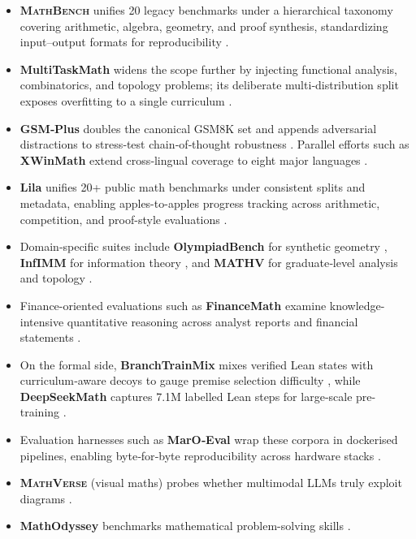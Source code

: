\documentclass[acmsmall,anonymous]{acmart}
\begin{document}
\begin{itemize}
    \item \textbf{\textsc{MathBench}} unifies 20 legacy benchmarks under a hierarchical taxonomy covering arithmetic, algebra, geometry, and proof synthesis, standardizing input–output formats for reproducibility \cite{yang2024mathbench,mathbench2024}.  
    \item \textbf{MultiTaskMath} widens the scope further by injecting functional analysis, combinatorics, and topology problems; its deliberate multi‐distribution split exposes overfitting to a single curriculum \cite{bang2023multitask}.  
    \item \textbf{GSM‐Plus} doubles the canonical GSM8K set and appends adversarial distractions to stress‐test chain‐of‐thought robustness \cite{li2024gsmplus}.  Parallel efforts such as \textbf{XWinMath} extend cross‐lingual coverage to eight major languages \cite{li2024xwinmath}.  
    \item \textbf{Lila} unifies 20+ public math benchmarks under consistent splits and metadata, enabling apples-to-apples progress tracking across arithmetic, competition, and proof-style evaluations \cite{mishra-2023-lila}.  
    \item Domain‐specific suites include \textbf{OlympiadBench} for synthetic geometry \cite{he2024bolympiadbench}, \textbf{InfIMM} for information theory \cite{han2024infimm}, and \textbf{MATHV} for graduate‐level analysis and topology \cite{wang2024mathv}.  
    \item Finance-oriented evaluations such as \textbf{FinanceMath} examine knowledge-intensive quantitative reasoning across analyst reports and financial statements \cite{zhao-2024-financemath}.  
    \item On the formal side, \textbf{BranchTrainMix} mixes verified Lean states with curriculum‐aware decoys to gauge premise selection difficulty \cite{wang2024branchtrainmix}, while \textbf{DeepSeekMath} captures 7.1M labelled Lean steps for large‐scale pre-training \cite{shao2024deepseekmath}.  
    \item Evaluation harnesses such as \textbf{MarO‐Eval} wrap these corpora in dockerised pipelines, enabling byte‐for‐byte reproducibility across hardware stacks \cite{zhang2024marioeval}.  
    \item \textbf{\textsc{MathVerse}} (visual maths) probes whether multimodal LLMs truly exploit diagrams \cite{zhang2024mathverse}.
    \item \textbf{MathOdyssey} benchmarks mathematical problem-solving skills \cite{fang2024}.

\end{itemize}
\end{document}
